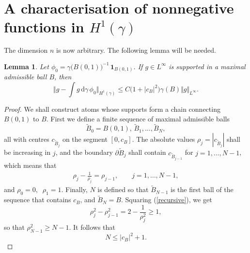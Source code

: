 \documentclass{amsart}                 %
\newtheorem{lemma}[theorem]{Lemma}
\numberwithin{equation}{section}
\renewcommand\mod[1]{\left\vert{#1}\right\vert}
\newcommand\norm[2]{{\Vert{#1}\Vert_{#2}}}
\newcommand\bignorm[2]{{\bigl\Vert{#1}\bigr\Vert_{#2}}}
\newcommand\wrt{\,\mathrm{d}}
\newcommand\1{{\bf 1}}
\newcommand\One{{\mathbf{1}}}
\begin{document}
\section{A characterisation of nonnegative functions in $H^1(\gamma)$}\label{maxcharpos}
The dimension $n$ is now arbitrary. The following lemma will be needed.
\begin{lemma}\label{trch}
Let $\phi _0=\gamma\big(B(0,1)\big)^{-1}\,\One_{B(0,1)}$. If $g \in L^\infty$ is  
supported in a maximal admissible ball $B$, then
$$
\bignorm{g-\int g \wrt\gamma\,\phi _0}{H^1(\gamma)}\le C\big(1+\mod{c_B}^2\big)
\gamma(B)\norm{g}{L^\infty}.
$$
\end{lemma}
\begin{proof}
We shall construct atoms whose supports form a chain connecting $B(0,1)$
to $B$. First
we define a finite sequence of maximal admissible balls
\[
\tilde{B} _0 = B(0,1),\, \tilde{B}_1, \ldots, \tilde{B}_{N },
\]
 all with centres
$c_{\tilde{B}_{j}}$ on the segment $[0, c_B]$. The absolute values
$\rho_j= |c_{\tilde{B}_{j}}|$    shall be increasing in $j$, and
the boundary $\partial \tilde{B}_j$ shall contain $c_{\tilde{B}_{j-1}}$
for $j = 1,\ldots,N-1$, which means that
\begin{align} \label{recursive}
\rho_{j} - \frac{1}{\rho_{j}}=\rho_{j-1}, \qquad j=1,
\ldots,N-1,
\end{align}
and $\rho_{0} = 0, \; \;\rho_{1} = 1$.
Finally, $N$ is defined so that $\tilde{B}_{N-1}$ is the first ball
of the sequence that contains $c_B$, and $\tilde{B}_{N } = B.$
Squaring (\ref{recursive}), we get
$$
\rho_{j}^2-\rho_{j-1}^2=2 - \frac1{\rho_{j}^2}\ge1,
$$
 so that $\rho_{N-1}^2 \ge N-1$. It follows that
 \begin{equation}
  \label{balls}
N \le |c_B|^2 + 1.
 \end{equation}
\par




\end{proof}
\end{document}
